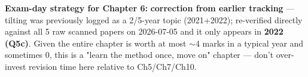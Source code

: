 \documentclass[12pt, a4paper]{article}
\newenvironment{notesbox}{\begin{mdframed}[style=notesframe]}{\end{mdframed}}
\begin{document}
\begin{notesbox}
\textbf{Exam-day strategy for Chapter 6:} \textbf{correction from earlier tracking} --- tilting was previously logged as a 2/5-year topic (2021+2022); re-verified directly against all 5 raw scanned papers on 2026-07-05 and it only appears in \textbf{2022 (Q5c)}. Given the entire chapter is worth at most $\sim$4 marks in a typical year and sometimes 0, this is a "learn the method once, move on" chapter --- don't over-invest revision time here relative to Ch5/Ch7/Ch10.
\end{notesbox}
\end{document}
